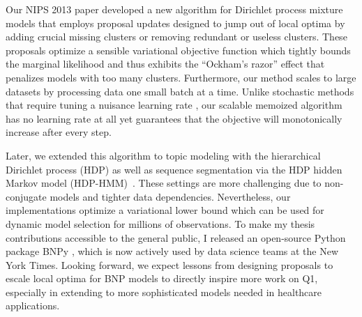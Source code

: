 \documentclass[11pt,letterpaper,sans]{article}
\begin{document}
Our NIPS 2013 paper \cite{hughes2013moVB} developed a new algorithm for Dirichlet process mixture models that employs proposal updates designed to jump out of local optima by adding crucial missing clusters or removing redundant or useless clusters. 
These proposals optimize a sensible variational objective function which tightly bounds the marginal likelihood and thus exhibits the ``Ockham's razor'' effect that penalizes models with too many clusters.
Furthermore, our method scales to large datasets by processing data one small batch at a time. Unlike stochastic methods that require tuning a nuisance learning rate \cite{hoffman:svi}, our scalable memoized algorithm has no learning rate at all yet guarantees that the objective will monotonically increase after every step.


Later, we extended this algorithm to topic modeling with the hierarchical Dirichlet process (HDP) \citep{hughes2015hdpreliable} as well as sequence segmentation via the HDP hidden Markov model (HDP-HMM)~\citep{hughes2015hdphmm}. 
These settings are more challenging due to non-conjugate models and tighter data dependencies.
Nevertheless, our implementations optimize a variational lower bound which can be used for dynamic model selection for millions of observations.
To make my thesis contributions accessible to the general public, I released an open-source Python package BNPy \citep{hughes2017bnpy}, which is now actively used by data science teams at the New York Times.
Looking forward, we expect lessons from designing proposals to escale local optima for BNP models to directly inspire 
more work on Q1, especially in extending to more sophisticated models needed in healthcare applications.
\end{document}
